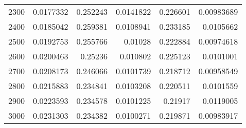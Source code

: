 \begin{tabular}{rrrrrr}
          2300 &               0.0177332  &     0.252243 &         0.0141822  &     0.226601 &         0.00983689 \\
          2400 &               0.0185042  &     0.259381 &         0.0108941  &     0.233185 &         0.0105662  \\
          2500 &               0.0192753  &     0.255766 &         0.01028    &     0.222884 &         0.00974618 \\
          2600 &               0.0200463  &     0.25236  &         0.010802   &     0.225123 &         0.0101001  \\
          2700 &               0.0208173  &     0.246066 &         0.0101739  &     0.218712 &         0.00958549 \\
          2800 &               0.0215883  &     0.234841 &         0.0103208  &     0.220511 &         0.0101559  \\
          2900 &               0.0223593  &     0.234578 &         0.0101225  &     0.21917  &         0.0119005  \\
          3000 &               0.0231303  &     0.234382 &         0.0100271  &     0.219871 &         0.00983917 \\
\hline
\end{tabular}